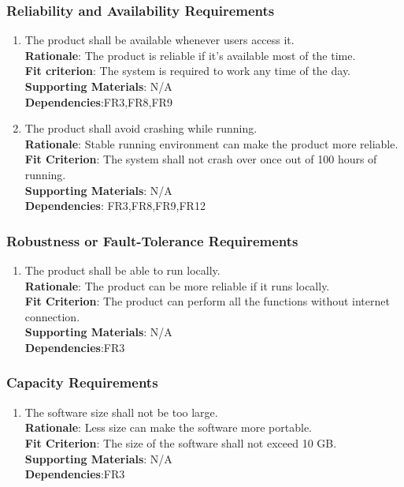 \documentclass{article}
\begin{document}
\subsubsection{Reliability and Availability Requirements}
\begin{enumerate}[PR4.1]
    \item The product shall be available whenever users access it.\\
    \textbf{Rationale}: The product is reliable if it's available most of the time.\\
    \textbf{Fit criterion}: The system is required to work any time of the day.\\
\textbf{Supporting Materials}: N/A\\
\textbf{Dependencies}:FR3,FR8,FR9\\
    
    \item The product shall avoid crashing while running.\\
    \textbf{Rationale}: Stable running environment can make the product more reliable.\\
    \textbf{Fit Criterion}: The system shall not crash over once out of 100 hours of running.\\
\textbf{Supporting Materials}: N/A\\
\textbf{Dependencies}: FR3,FR8,FR9,FR12\\

\end{enumerate}
\subsubsection{Robustness or Fault-Tolerance Requirements}
\begin{enumerate}[PR5.1]
    \item The product shall be able to run locally.\\
    \textbf{Rationale}: The product can be more reliable if it runs locally.\\
    \textbf{Fit Criterion}: The product can perform all the functions without internet connection.\\
\textbf{Supporting Materials}: N/A\\
\textbf{Dependencies}:FR3\\

\end{enumerate}
\subsubsection{Capacity Requirements}
\begin{enumerate}[PR6.1]
    \item The software size shall not be too large.\\
    \textbf{Rationale}: Less size can make the software more portable.\\
    \textbf{Fit Criterion}: The size of the software shall not exceed 10 GB.\\
\textbf{Supporting Materials}: N/A\\
\textbf{Dependencies}:FR3\\

\end{enumerate}
\end{document}
